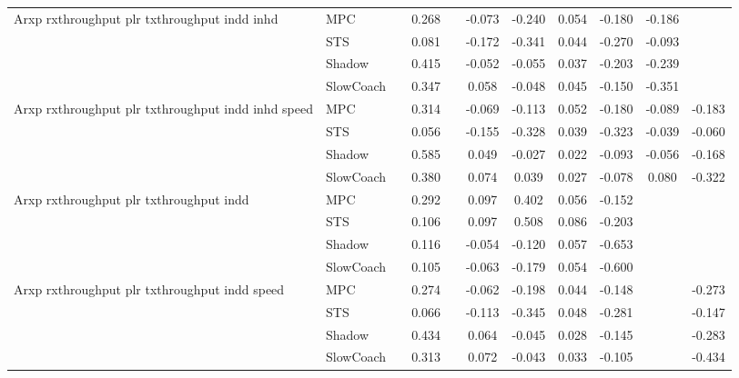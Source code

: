 \begin{tabular}{|l|l|*{9}{c|}}
\midrule
Arxp rxthroughput plr txthroughput indd inhd    & MPC &       &     0.268 &        & -0.073 & -0.240 &  0.054 &  -0.180 &  -0.186 &       \\
                              & STS &       &     0.081 &        & -0.172 & -0.341 &  0.044 &  -0.270 &  -0.093 &       \\
                              & Shadow &       &     0.415 &        & -0.052 & -0.055 &  0.037 &  -0.203 &  -0.239 &       \\
                              & SlowCoach &       &     0.347 &        &  0.058 & -0.048 &  0.045 &  -0.150 &  -0.351 &       \\
\midrule
Arxp rxthroughput plr txthroughput indd inhd speed    & MPC &       &     0.314 &        & -0.069 & -0.113 &  0.052 &  -0.180 &  -0.089 &   -0.183 \\
                              & STS &       &     0.056 &        & -0.155 & -0.328 &  0.039 &  -0.323 &  -0.039 &   -0.060 \\
                              & Shadow &       &     0.585 &        &  0.049 & -0.027 &  0.022 &  -0.093 &  -0.056 &   -0.168 \\
                              & SlowCoach &       &     0.380 &        &  0.074 &  0.039 &  0.027 &  -0.078 &   0.080 &   -0.322 \\
\midrule
Arxp rxthroughput plr txthroughput indd    & MPC &       &     0.292 &        &  0.097 &  0.402 &  0.056 &  -0.152 &      &       \\
                              & STS &       &     0.106 &        &  0.097 &  0.508 &  0.086 &  -0.203 &      &       \\
                              & Shadow &       &     0.116 &        & -0.054 & -0.120 &  0.057 &  -0.653 &      &       \\
                              & SlowCoach &       &     0.105 &        & -0.063 & -0.179 &  0.054 &  -0.600 &      &       \\
\midrule
Arxp rxthroughput plr txthroughput indd speed    & MPC &       &     0.274 &        & -0.062 & -0.198 &  0.044 &  -0.148 &      &   -0.273 \\
                              & STS &       &     0.066 &        & -0.113 & -0.345 &  0.048 &  -0.281 &      &   -0.147 \\
                              & Shadow &       &     0.434 &        &  0.064 & -0.045 &  0.028 &  -0.145 &      &   -0.283 \\
                              & SlowCoach &       &     0.313 &        &  0.072 & -0.043 &  0.033 &  -0.105 &      &   -0.434 \\

\end{tabular}
